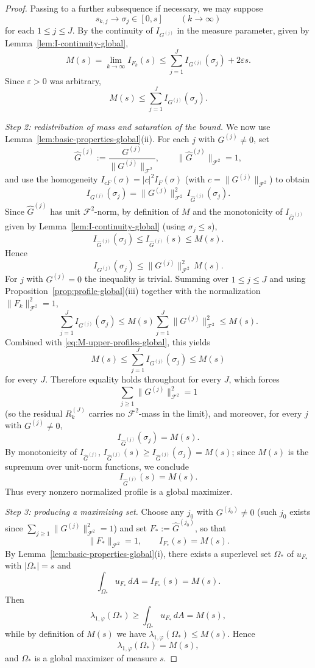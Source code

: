 \begin{proof}
Passing to a further subsequence if necessary, we may suppose
\[
s_{k,j}\to \sigma_j\in [0,s]
\qquad (k\to\infty)
\]
for each \(1\le j\le J\). By the continuity of \(I_{G^{(j)}}\) in the
measure parameter, given by Lemma~\ref{lem:I-continuity-global},
\[
M(s)=\lim_{k\to\infty}I_{F_k}(s)
\le
\sum_{j=1}^J I_{G^{(j)}}(\sigma_j)+2\varepsilon s.
\]
Since \(\varepsilon>0\) was arbitrary,
\begin{equation}\label{eq:M-upper-profiles-global}
M(s)\le \sum_{j=1}^J I_{G^{(j)}}(\sigma_j).
\end{equation}

\medskip
\noindent\emph{Step 2: redistribution of mass and saturation of the bound.}
We now use Lemma~\ref{lem:basic-properties-global}(ii). For each \(j\) with
\(G^{(j)}\neq 0\), set
\[
\widehat G^{(j)}:=\frac{G^{(j)}}{\|G^{(j)}\|_{\mathcal F^2}},
\qquad
\|\widehat G^{(j)}\|_{\mathcal F^2}=1,
\]
and use the homogeneity \(I_{cF}(\sigma)=|c|^2 I_F(\sigma)\) (with
\(c=\|G^{(j)}\|_{\mathcal F^2}\)) to obtain
\[
I_{G^{(j)}}(\sigma_j)
=
\|G^{(j)}\|_{\mathcal F^2}^2
\,I_{\widehat G^{(j)}}(\sigma_j).
\]
Since \(\widehat G^{(j)}\) has unit \(\mathcal F^2\)-norm, by definition of
\(M\) and the monotonicity of \(I_{\widehat G^{(j)}}\) given by
Lemma~\ref{lem:I-continuity-global} (using \(\sigma_j\le s\)),
\[
I_{\widehat G^{(j)}}(\sigma_j)\le I_{\widehat G^{(j)}}(s)\le M(s).
\]
Hence
\[
I_{G^{(j)}}(\sigma_j)\le \|G^{(j)}\|_{\mathcal F^2}^2\, M(s).
\]
For \(j\) with \(G^{(j)}=0\) the inequality is trivial. Summing over
\(1\le j\le J\) and using Proposition~\ref{prop:profile-global}(iii)
together with the normalization \(\|F_k\|_{\mathcal F^2}^2=1\),
\[
\sum_{j=1}^J I_{G^{(j)}}(\sigma_j)
\le
M(s)\sum_{j=1}^J \|G^{(j)}\|_{\mathcal F^2}^2
\le M(s).
\]
Combined with \eqref{eq:M-upper-profiles-global}, this yields
\[
M(s)\le \sum_{j=1}^J I_{G^{(j)}}(\sigma_j)\le M(s)
\]
for every \(J\). Therefore equality holds throughout for every \(J\), which
forces
\[
\sum_{j\ge 1}\|G^{(j)}\|_{\mathcal F^2}^2=1
\]
(so the residual \(R_k^{(J)}\) carries no \(\mathcal F^2\)-mass in the
limit), and moreover, for every \(j\) with \(G^{(j)}\neq 0\),
\[
I_{\widehat G^{(j)}}(\sigma_j)=M(s).
\]
By monotonicity of \(I_{\widehat G^{(j)}}\),
\(I_{\widehat G^{(j)}}(s)\ge I_{\widehat G^{(j)}}(\sigma_j)=M(s)\); since
\(M(s)\) is the supremum over unit-norm functions, we conclude
\[
I_{\widehat G^{(j)}}(s)=M(s).
\]
Thus every nonzero normalized profile is a global maximizer.

\medskip
\noindent\emph{Step 3: producing a maximizing set.}
Choose any \(j_0\) with \(G^{(j_0)}\neq 0\) (such \(j_0\) exists since
\(\sum_{j\ge 1}\|G^{(j)}\|_{\mathcal F^2}^2=1\)) and set
\(F_*:=\widehat G^{(j_0)}\), so that
\[
\|F_*\|_{\mathcal F^2}=1,
\qquad
I_{F_*}(s)=M(s).
\]
By Lemma~\ref{lem:basic-properties-global}(i), there exists a superlevel
set \(\Omega_*\) of \(u_{F_*}\) with \(|\Omega_*|=s\) and
\[
\int_{\Omega_*}u_{F_*}\,dA=I_{F_*}(s)=M(s).
\]
Then
\[
\lambda_{1,\varphi}(\Omega_*)\ge \int_{\Omega_*}u_{F_*}\,dA=M(s),
\]
while by definition of \(M(s)\) we have
\(\lambda_{1,\varphi}(\Omega_*)\le M(s)\). Hence
\[
\lambda_{1,\varphi}(\Omega_*)=M(s),
\]
and \(\Omega_*\) is a global maximizer of measure \(s\).
\end{proof}

